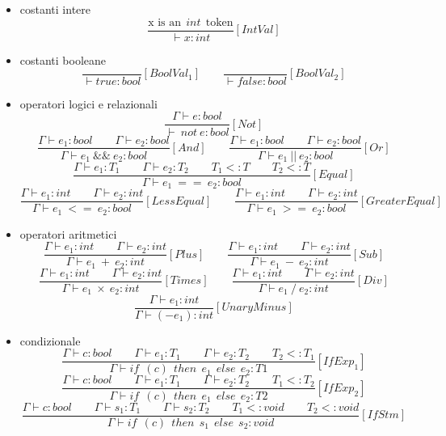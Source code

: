 \documentclass[a4paper]{article}   %
\begin{document}
\begin{itemize}
  \item costanti intere
  $$ \frac{\text{x \ \ is \ \ an} \ \ int \ \ \text{token}}{\vdash x : int}[IntVal] $$
  \item costanti booleane
  $$ \frac{}{\vdash true : bool}[BoolVal_1] \qquad \frac{}{\vdash false : bool}[BoolVal_2] $$
  \item operatori logici e relazionali
  $$ \frac{\Gamma\vdash e : bool}{\vdash\ not\ e : bool}[Not] $$
  $$ \frac{\Gamma \vdash e_1 : bool \qquad \Gamma \vdash e_2 : bool}{\Gamma \vdash e_1 \ \&\& \ e_2 : bool}[And] \qquad \frac{\Gamma \vdash e_1 : bool \qquad \Gamma \vdash e_2 : bool}{\Gamma \vdash e_1 \ || \ e_2 : bool}[Or] $$
  $$ \frac{\Gamma \vdash e_1 : T_1 \qquad \Gamma \vdash e_2 : T_2 \qquad T_1 <: T \qquad T_2<:T}{\Gamma \vdash e_1 \ == \ e_2 : bool}[Equal] $$
  $$ \frac{\Gamma \vdash e_1 : int \qquad \Gamma \vdash e_2 : int}{\Gamma \vdash e_1 \ <= \ e_2 : bool}[LessEqual] \qquad \frac{\Gamma \vdash e_1 : int \qquad \Gamma \vdash e_2 : int}{\Gamma \vdash e_1 \ >= \ e_2 : bool}[GreaterEqual] $$

  \item operatori aritmetici
  $$ \frac{\Gamma \vdash e_1 : int \qquad \Gamma \vdash e_2 : int}{\Gamma \vdash e_1 \ + \ e_2 : int}[Plus] \qquad \frac{\Gamma \vdash e_1 : int \qquad \Gamma \vdash e_2 : int}{\Gamma \vdash e_1 \ - \ e_2 : int}[Sub] $$
  $$ \frac{\Gamma \vdash e_1 : int \qquad \Gamma \vdash e_2 : int}{\Gamma \vdash e_1 \ \times \ e_2 : int}[Times] \qquad \frac{\Gamma \vdash e_1 : int \qquad \Gamma \vdash e_2 : int}{\Gamma \vdash e_1 \ / \ e_2 : int}[Div] $$
  $$ \frac{\Gamma \vdash e_1 : int}{\Gamma \vdash (- e_1) : int}[UnaryMinus] $$
  \item condizionale
  $$ \frac{\Gamma \vdash c : bool \qquad \Gamma \vdash e_1 : T_1 \qquad \Gamma \vdash e_2 : T_2 \qquad T_2 <: T_1}{\Gamma \vdash if \ \ (c) \ \ then \ \ {e_1} \ \ else \ \ {e_2} : T1}[IfExp_1] $$
  $$ \frac{\Gamma \vdash c : bool \qquad \Gamma \vdash e_1 : T_1 \qquad \Gamma \vdash e_2 : T_2 \qquad T_1 <: T_2}{\Gamma \vdash if \ \ (c) \ \ then \ \ {e_1} \ \ else \ \ {e_2} : T2}[IfExp_2] $$
  $$ \frac{\Gamma \vdash c : bool \qquad \Gamma \vdash s_1 : T_1 \qquad \Gamma \vdash s_2 : T_2 \qquad T_1 <: void \qquad T_2 <: void}{\Gamma \vdash if \ \ (c) \ \ then \ \ {s_1} \ \ else \ \ {s_2} : void}[IfStm] $$


\end{itemize}
\end{document}
